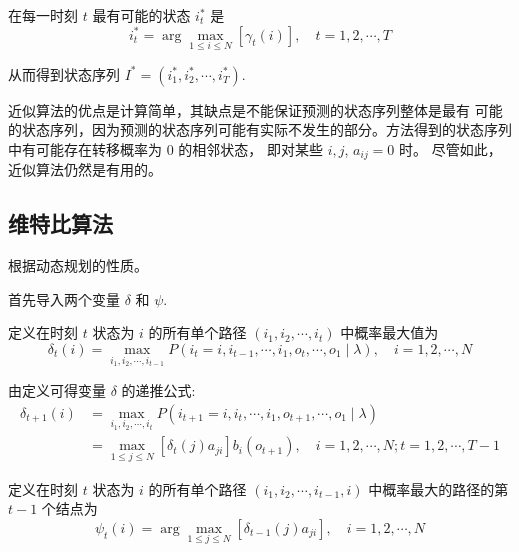 在每一时刻 $ t $ 最有可能的状态 $ i_{t}^{*} $ 是
\begin{equation}
i_{t}^{*}=\arg \max _{1 \leqslant i \leqslant N}\left[\gamma_{t}(i)\right], \quad t=1,2, \cdots, T
\end{equation}

从而得到状态序列 $ I^{*}=\left(i_{1}^{*}, i_{2}^{*}, \cdots, i_{T}^{*}\right) $.

\begin{remark}
   近似算法的优点是计算简单，其缺点是不能保证预测的状态序列整体是最有
可能的状态序列，因为预测的状态序列可能有实际不发生的部分。方法得到的状态序列中有可能存在转移概率为 0 的相邻状态， 即对某些 $ i, j $, $ a_{i j}=0 $ 时。 尽管如此， 近似算法仍然是有用的。 
\end{remark}

\subsection{维特比算法}

根据动态规划的性质。 

首先导入两个变量 $ \delta $ 和 $ \psi $. 

\begin{definition}
    定义在时刻 $ t $ 状态为 $ i $ 的所有单个路径 $ \left(i_{1}, i_{2}, \cdots, i_{t}\right) $ 中概率最大值为
\begin{equation}
\delta_{t}(i)=\max _{i_1, i_{2}, \cdots, i_{t-1}} P\left(i_{t}=i, i_{t-1}, \cdots, i_{1}, o_{t}, \cdots, o_{1} \mid \lambda\right), \quad i=1,2, \cdots, N
\end{equation}
\end{definition}

\begin{corollary}
   由定义可得变量 $ \delta $ 的递推公式:
\begin{equation}
\begin{aligned}
\delta_{t+1}(i) &=\max _{i_1, i_2, \cdots, i_{t}} P\left(i_{t+1}=i, i_{t}, \cdots, i_{1}, o_{t+1}, \cdots, o_{1} \mid \lambda\right) \\
&=\max _{1 \leqslant j \leqslant N}\left[\delta_{t}(j) a_{j i}\right] b_{i}\left(o_{t+1}\right), \quad i=1,2, \cdots, N ; t=1,2, \cdots, T-1
\end{aligned}
\end{equation} 
\end{corollary}

\begin{definition}
    定义在时刻 $ t $ 状态为 $ i $ 的所有单个路径 $ \left(i_{1}, i_{2}, \cdots, i_{t-1}, i\right) $ 中概率最大的路径的第 $ t-1 $ 个结点为
\begin{equation}
\psi_{t}(i)=\arg \max _{1 \leqslant j \leqslant N}\left[\delta_{t-1}(j) a_{j i}\right], \quad i=1,2, \cdots, N
\end{equation}
\end{definition}



